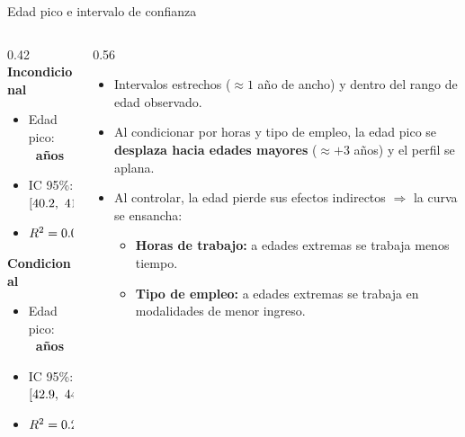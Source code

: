\documentclass[aspectratio=169]{beamer}
\begin{document}
\begin{frame}{Edad pico e intervalo de confianza}
  \begin{columns}[T]
    \begin{column}{0.42\textwidth}
      \textcolor{uandespurple}{\textbf{Incondicional}}
      \begin{itemize}
        \item Edad pico: \textbf{\AgePeakUncond\ años}
        \item IC 95\%: $[\AgePeakUncondLo,\ \AgePeakUncondHi]$
        \item $R^2 = 0.052$
      \end{itemize}
      \vspace{0.6em}
      \textcolor{uandesblue}{\textbf{Condicional}}
      \begin{itemize}
        \item Edad pico: \textbf{\AgePeakCond\ años}
        \item IC 95\%: $[\AgePeakCondLo,\ \AgePeakCondHi]$
        \item $R^2 = 0.227$
      \end{itemize}
    \end{column}
    \begin{column}{0.56\textwidth}
      \begin{itemize}
        \item Intervalos estrechos ($\approx 1$ año de ancho) y dentro del rango de edad observado.
        \item Al condicionar por horas y tipo de empleo, la edad pico se
          \textbf{desplaza hacia edades mayores} ($\approx +3$ años) y el perfil
          se aplana.
        \item Al controlar, la edad pierde sus efectos indirectos $\Rightarrow$ la curva se ensancha:
          \begin{itemize}
            \item \textbf{Horas de trabajo:} a edades extremas se trabaja menos tiempo.
            \item \textbf{Tipo de empleo:} a edades extremas se trabaja en modalidades de menor ingreso.
          \end{itemize}
      \end{itemize}
    \end{column}
  \end{columns}
\end{frame}
\end{document}
